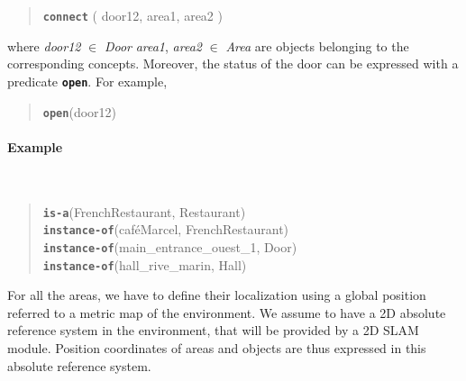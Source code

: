\documentclass{article}
\begin{document}
\begin{quote}
{\bf\tt connect} ( door12, area1, area2 )
\end{quote}

\noindent
where \emph{door12} $\in$ \emph{Door} \emph{area1}, \emph{area2} $\in$ \emph{Area}  are objects belonging to the corresponding concepts. Moreover, the status of the door can be expressed with a predicate {\tt\bf open}. For example,

\begin{quote}
{\tt\bf open}(door12) \\
\end{quote}







\paragraph*{\bf Example}~\\

\begin{quote}
{\tt\bf is-a}(FrenchRestaurant, Restaurant) \\
{\tt\bf instance-of}(caf\'eMarcel, FrenchRestaurant) \\
{\tt\bf instance-of}(main\_entrance\_ouest\_1, Door) \\
{\tt\bf instance-of}(hall\_rive\_marin, Hall) \\
\end{quote}


For all the areas, we have to define their localization using a global position referred to a metric map of the environment. We assume to have a 2D absolute reference system in the environment, that will be provided by a 2D SLAM module. Position coordinates of areas and objects are thus expressed in this absolute reference system.
\end{document}

